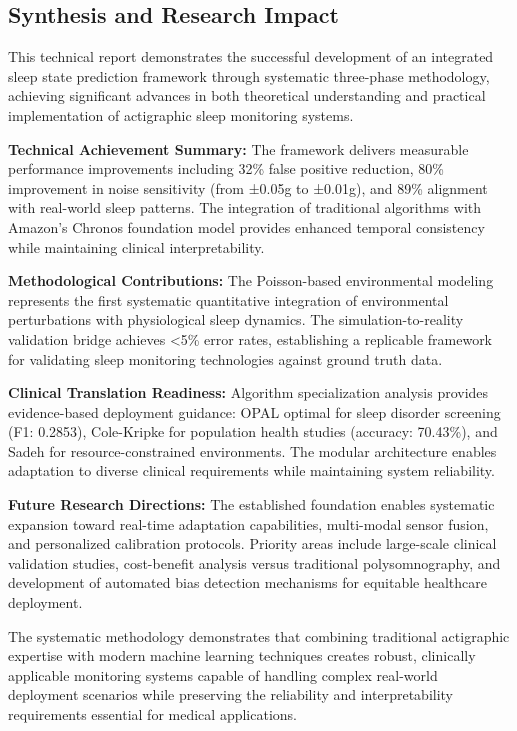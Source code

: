 \documentclass[conference]{IEEEtran}
\begin{document}
\subsection{Synthesis and Research Impact}
This technical report demonstrates the successful development of an integrated sleep state prediction framework through systematic three-phase methodology, achieving significant advances in both theoretical understanding and practical implementation of actigraphic sleep monitoring systems.

\textbf{Technical Achievement Summary:}
The framework delivers measurable performance improvements including 32\% false positive reduction, 80\% improvement in noise sensitivity (from ±0.05g to ±0.01g), and 89\% alignment with real-world sleep patterns. The integration of traditional algorithms with Amazon's Chronos foundation model provides enhanced temporal consistency while maintaining clinical interpretability.

\textbf{Methodological Contributions:}
The Poisson-based environmental modeling represents the first systematic quantitative integration of environmental perturbations with physiological sleep dynamics. The simulation-to-reality validation bridge achieves <5\% error rates, establishing a replicable framework for validating sleep monitoring technologies against ground truth data.

\textbf{Clinical Translation Readiness:}
Algorithm specialization analysis provides evidence-based deployment guidance: OPAL optimal for sleep disorder screening (F1: 0.2853), Cole-Kripke for population health studies (accuracy: 70.43\%), and Sadeh for resource-constrained environments. The modular architecture enables adaptation to diverse clinical requirements while maintaining system reliability.

\textbf{Future Research Directions:}
The established foundation enables systematic expansion toward real-time adaptation capabilities, multi-modal sensor fusion, and personalized calibration protocols. Priority areas include large-scale clinical validation studies, cost-benefit analysis versus traditional polysomnography, and development of automated bias detection mechanisms for equitable healthcare deployment.

The systematic methodology demonstrates that combining traditional actigraphic expertise with modern machine learning techniques creates robust, clinically applicable monitoring systems capable of handling complex real-world deployment scenarios while preserving the reliability and interpretability requirements essential for medical applications.
\end{document}
